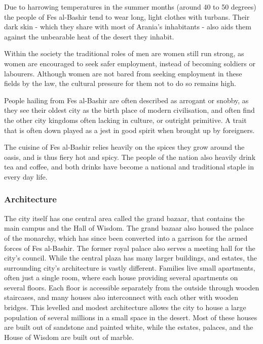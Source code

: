 Due to harrowing temperatures in the summer months (around 40 to 50 degrees)
the people of Fes al-Bashir tend to wear long, light clothes with
turbans. Their dark skin - which they share with most of Arania's inhabitants
- also aids them against the unbearable heat of the desert they inhabit.

Within the society the traditional roles of men are women still run strong, as
women are encouraged to seek safer employment, instead of becoming soldiers or
labourers. Although women are not bared from seeking employment in these
fields by the law, the cultural pressure for them not to do so remains high.

People hailing from Fes al-Bashir are often described as arrogant or snobby,
as they see their oldest city as the birth place of modern civilisation, and
often find the other city kingdoms often lacking in culture, or outright
primitive. A trait that is often down played as a jest in good spirit when
brought up by foreigners.

The cuisine of Fes al-Bashir relies heavily on the spices they grow around the
oasis, and is thus fiery hot and spicy. The people of the nation also heavily
drink tea and coffee, and both drinks have become a national and traditional
staple in every day life.

\subsubsection{Architecture}

The city itself has one central area called the grand bazaar, that contains the
main campus and the Hall of Wisdom. The grand bazaar also housed the palace of
the monarchy, which has since been converted into a garrison for the armed
forces of Fes al-Bashir. The former royal palace also serves a meeting hall
for the city's council. While the central plaza has many larger buildings, and
estates, the surrounding city's architecture is vastly different. Families live
small apartments, often just a single room, where each house providing several
apartments on several floors. Each floor is accessible separately from the
outside through wooden staircases, and many houses also interconnect with each
other with wooden bridges. This levelled and modest architecture allows the
city to house a large population of several millions in a small space in the
desert. Most of these houses are built out of sandstone and painted white, while
the estates, palaces, and the House of Wisdom are built out of marble.

